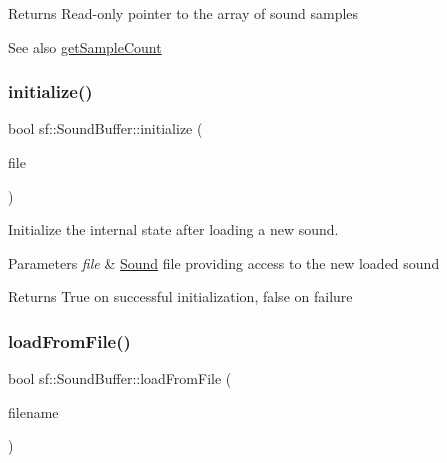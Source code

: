 \begin{DoxyReturn}{Returns}
Read-\/only pointer to the array of sound samples
\end{DoxyReturn}
\begin{DoxySeeAlso}{See also}
\mbox{\hyperlink{classsf_1_1_sound_buffer_aebe2a4bdbfbd9249353748da3f6a4fa1}{get\+Sample\+Count}} \begin{DoxyVerb}\end{DoxyVerb}
 
\end{DoxySeeAlso}
\mbox{\label{classsf_1_1_sound_buffer_aa3c563ecb5a554c8975d93044be6fc54}} 
\subsubsection{\texorpdfstring{initialize()}{initialize()}}
{\footnotesize\ttfamily bool sf\+::\+Sound\+Buffer\+::initialize (\begin{DoxyParamCaption}\item[{\mbox{\hyperlink{classsf_1_1_input_sound_file}{Input\+Sound\+File}} \&}]{file }\end{DoxyParamCaption})\hspace{0.3cm}{\ttfamily [private]}}



Initialize the internal state after loading a new sound. 


\begin{DoxyParams}{Parameters}
{\em file} & \mbox{\hyperlink{classsf_1_1_sound}{Sound}} file providing access to the new loaded sound\\
\hline
\end{DoxyParams}
\begin{DoxyReturn}{Returns}
True on successful initialization, false on failure \begin{DoxyVerb}\end{DoxyVerb}
 
\end{DoxyReturn}
\mbox{\label{classsf_1_1_sound_buffer_a2be6a8025c97eb622a7dff6cf2594394}} 
\subsubsection{\texorpdfstring{loadFromFile()}{loadFromFile()}}
{\footnotesize\ttfamily bool sf\+::\+Sound\+Buffer\+::load\+From\+File (\begin{DoxyParamCaption}\item[{const std\+::string \&}]{filename }\end{DoxyParamCaption})}



